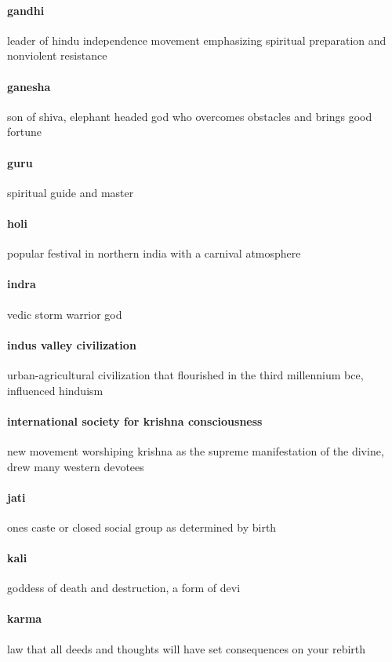 \documentclass{article}
\begin{document}
\paragraph{gandhi}
\label{par:gandhi}
leader of hindu independence movement emphasizing spiritual preparation and nonviolent resistance
\paragraph{ganesha}
\label{par:ganesha}
son of shiva, elephant headed god who overcomes obstacles and brings good fortune
\paragraph{guru}
\label{par:guru}
spiritual guide and master
\paragraph{holi}
\label{par:holi}
popular festival in northern india with a carnival atmosphere
\paragraph{indra}
\label{par:indra}
vedic storm warrior god
\paragraph{indus valley civilization}
\label{par:indus_valley_civilization}
urban-agricultural civilization that flourished in the third millennium bce, influenced hinduism
\paragraph{international society for krishna consciousness}
\label{par:international_society_for_krishna_consciousness}
new movement worshiping krishna as the supreme manifestation of the divine, drew many western devotees
\paragraph{jati}
\label{par:jati}
ones caste or closed social group as determined by birth
\paragraph{kali}
\label{par:kali}
goddess of death and destruction, a form of devi
\paragraph{karma}
\label{par:karma}
law that all deeds and thoughts will have set consequences on your rebirth
\end{document}
